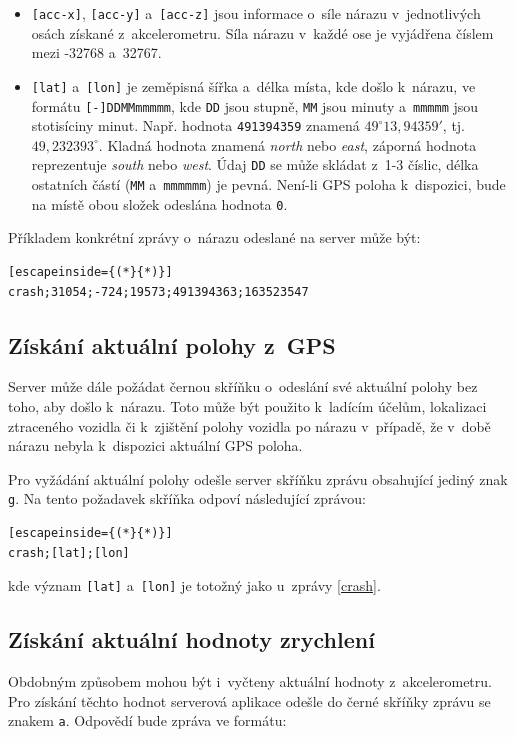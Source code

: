 \documentclass[a4paper,11pt,titlepage]{article}
\begin{document}
\begin{itemize}
\item \texttt{[acc-x]}, \texttt{[acc-y]} a~\texttt{[acc-z]} jsou informace o~síle nárazu v~jednotlivých osách
získané z~akcelerometru. Síla nárazu v~každé ose je vyjádřena číslem mezi -32768
a~32767.
\item \texttt{[lat]} a~\texttt{[lon]} je zeměpisná šířka a~délka místa, kde došlo k~nárazu, ve formátu
\texttt{[-]DDMMmmmmm}, kde \texttt{DD} jsou stupně, \texttt{MM} jsou minuty a~\texttt{mmmmm} jsou stotisíciny minut.
Např. hodnota \texttt{491394359} znamená $49^\circ13,94359'$, tj. $49,232393^\circ$. Kladná hodnota znamená \textit{north} nebo \textit{east}, záporná hodnota reprezentuje
\textit{south} nebo \textit{west}. Údaj \texttt{DD} se může skládat z~1-3 číslic, délka ostatních
částí (\texttt{MM} a~\texttt{mmmmmm}) je pevná. Není-li GPS poloha k~dispozici, bude
na místě obou složek odeslána hodnota \texttt{0}.
\end{itemize}

Příkladem konkrétní zprávy o~nárazu odeslané na server může být:

\begin{lstlisting}[escapeinside={(*}{*)}]
crash;31054;-724;19573;491394363;163523547
\end{lstlisting}

\subsection{Získání aktuální polohy z~GPS}
\label{gps}
Server může dále požádat černou skříňku o~odeslání své aktuální polohy bez toho,
aby došlo k~nárazu. Toto může být použito k~ladícím účelům, lokalizaci ztraceného
vozidla či k~zjištění polohy vozidla po nárazu v~případě, že v~době nárazu nebyla k~dispozici
aktuální GPS poloha.

Pro vyžádání aktuální polohy odešle server skříňku zprávu obsahující jediný znak \texttt{g}.
Na tento požadavek skříňka odpoví následující zprávou:

\begin{lstlisting}[escapeinside={(*}{*)}]
crash;[lat];[lon]
\end{lstlisting}

kde význam \texttt{[lat]} a~\texttt{[lon]} je totožný jako u~zprávy \ref{crash}.

\subsection{Získání aktuální hodnoty zrychlení}
\label{acc}
Obdobným způsobem mohou být i~vyčteny aktuální hodnoty z~akcelerometru. Pro získání
těchto hodnot serverová aplikace odešle do černé skříňky zprávu se znakem \texttt{a}.
Odpovědí bude zpráva ve formátu:
\end{document}
